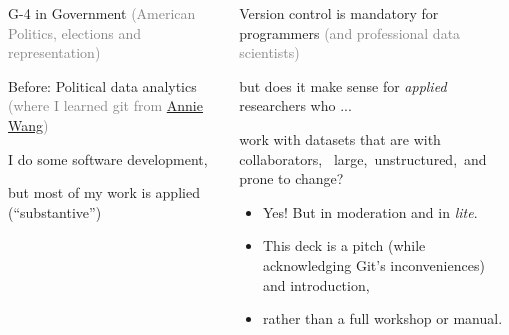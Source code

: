 \documentclass[ignorenonframetext, 10pt, aspectratio=169]{beamer}
\begin{document}
\begin{frame}{}

\begin{columns}[T]

\begin{column}{0.4\textwidth}
\begin{wideitemize}
\item G-4 in Government \textcolor{gray}{(American Politics, elections and representation)}
\item Before: Political data analytics \textcolor{gray}{(where I learned git from \href{https://anniejw.com/}{Annie Wang})}
\end{wideitemize}
\bigskip
\begin{wideitemize}
\item I do some software development,
\item but most of my work is applied (``substantive'')
\end{wideitemize}
\end{column}\pause
\begin{column}{0.6\textwidth}
\begin{wideitemize}
\item Version control is mandatory for programmers \textcolor{gray}{(and professional data scientists)}
\item but does it make sense for \emph{applied} researchers who ...
\item work with datasets that are \alert{with collaborators}, ~\alert{large},\pause ~\alert{unstructured},\pause ~and \alert{prone to change}?
\end{wideitemize}\pause

\medskip
{}

\begin{tcolorbox}
\begin{itemize}
\item[{}] Yes! But in moderation and in \emph{lite}.
\item[{}] This deck is a  pitch (while acknowledging Git's inconveniences) and introduction,
\item[{}] rather than a full workshop or manual.
\end{itemize}
\end{tcolorbox}
\end{column}
\end{columns}
\end{frame}
\end{document}
